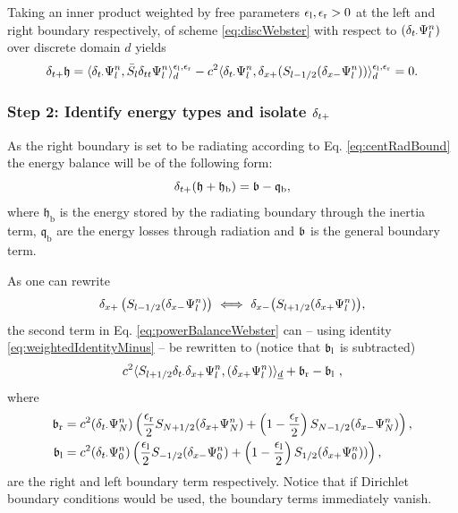 {Taking an inner product weighted by free parameters $\epsilon_\text{l}, \epsilon_\text{r} > 0$ at the left and right boundary respectively, of scheme \eqref{eq:discWebster} with respect to $(\delta_{t\cdot} \Psi_l^n)$ over discrete domain $d$ yields 
\begin{equation}\label{eq:powerBalanceWebster}
    \delta_{t+} \mathfrak{h} = \langle \delta_{t\cdot}\Psi_l^n ,\bar{S}_l \delta_{tt}\Psi^n_l\rangle_d^{\epsilon_\text{l},\epsilon_\text{r}} - c^2\langle\delta_{t\cdot}\Psi_l^n, \delta_{x+}(S_{l-1/2}(\delta_{x-}\Psi_l^n))\rangle_d^{\epsilon_\text{l},\epsilon_\text{r}} = 0.
\end{equation}

\subsubsection{Step 2: Identify energy types and isolate $\delta_{t+}$} 
As the right boundary is set to be radiating according to Eq. \eqref{eq:centRadBound} the energy balance will be of the following form:
\begin{equation}\label{eq:radiatingEnergyForm}
    \delta_{t+}(\mathfrak{h}+\mathfrak{h}_\text{b}) = \mathfrak{b}-\mathfrak{q}_\text{b},
\end{equation}
where $\mathfrak{h}_\text{b}$ is the energy stored by the radiating boundary through the inertia term, $\mathfrak{q}_\text{b}$ are the energy losses through radiation and $\mathfrak{b}$ is the general boundary term.

As one can rewrite
\begin{equation}\label{eq:switchSignsWebster}
    \dxp\left(\Sm(\delta_{x-}\Psiln)\right) \ \Longleftrightarrow\  \dxm\big(\Sp(\dxp\Psiln)\big),
\end{equation}
the second term in Eq. \eqref{eq:powerBalanceWebster} can -- using identity \eqref{eq:weightedIdentityMinus} -- be rewritten to (notice that $\mathfrak{b}_\text{l}$ is subtracted)
\begin{equation*}
    c^2\langle S_{l+1/2} \delta_{t\cdot} \delta_{x+} \Psi_l^n, (\delta_{x+} \Psi_l^n)\rangle_{\underline{d}} + \mathfrak{b}_\text{r} - \mathfrak{b}_\text{l}\ ,
\end{equation*}
where
\begin{subequations}
    \begin{align}
     \mathfrak{b}_\text{r} &= c^2(\delta_{t\cdot}\Psi_N^n)\left(\frac{\epsilon_\text{r}}{2}S_{N+1/2}(\delta_{x+} \Psi_N^n) + \left(1-\frac{\epsilon_\text{r}}{2}\right)S_{N-1/2}(\delta_{x-}\Psi_N^n)\right), \\
     \mathfrak{b}_\text{l} &= c^2(\delta_{t\cdot}\Psi_0^n)\left(\frac{\epsilon_\text{l}}{2}S_{-1/2}(\delta_{x-}\Psi_0^n)+\left(1-\frac{\epsilon_\text{l}}{2}\right)S_{1/2}(\delta_{x+} \Psi_0^n))\right),
    \end{align}
\end{subequations}
are the right and left boundary term respectively. Notice that if Dirichlet boundary conditions would be used, the boundary terms immediately vanish. 
    
}
